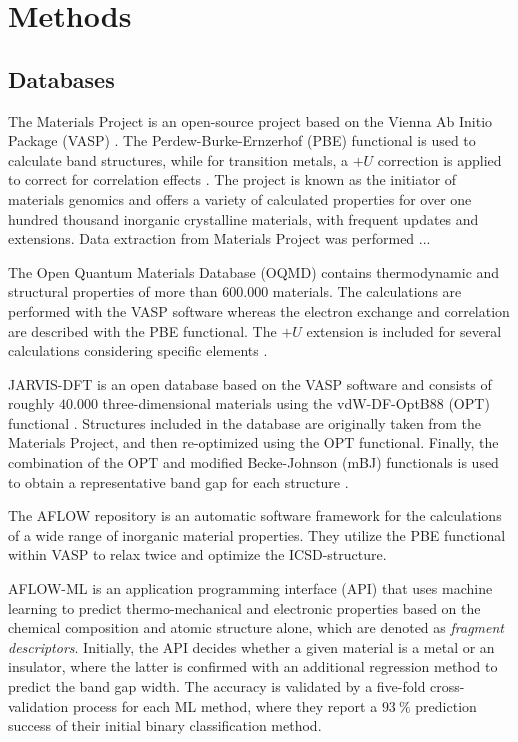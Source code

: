 \documentclass[superscriptaddress,unsortedaddress,
 amsmath,amssymb,
 aps,
]{revtex4-2}
\begin{document}
\section*{Methods}

\subsection*{Databases} 
The Materials Project \cite{Jain2013, Jain2018} is an open-source project based on the Vienna Ab Initio Package (VASP) \cite{Kresse1996}. The Perdew-Burke-Ernzerhof \cite{Perdew1996} (PBE) functional is used to calculate band structures, while for transition metals, a $+U$ correction is applied to correct for correlation effects \cite{Wang2006}. The project is known as the initiator of materials genomics and offers a variety of calculated properties for over one hundred thousand inorganic crystalline materials, with frequent updates and extensions. Data extraction from Materials Project was performed ... 

The Open Quantum Materials Database (OQMD) \cite{Saal2013, Kirklin2015} contains thermodynamic and structural properties of more than $600.000$  materials. The calculations are performed with the VASP software whereas the electron exchange and correlation are described with the PBE functional. The $+U$ extension is included for several calculations considering specific elements \cite{Stevanovic2012}. 

JARVIS-DFT \cite{Choudhary2020} is an open database based on the VASP software and consists of roughly $40.000$ three-dimensional materials using the vdW-DF-OptB88 (OPT) functional \cite{Thonhauser2007, Klimes2011}. Structures included in the database are originally taken from the Materials
Project, and then re-optimized using the OPT functional. Finally, the combination of the OPT and modified Becke-Johnson (mBJ) functionals is used to obtain a representative band gap for each structure \cite{Choudhary2018a}. 

The AFLOW \cite{Curtarolo2012, Curtarolo2012a, Calderon2015} repository is an automatic software framework for the calculations of a wide range of inorganic material properties. They utilize the PBE functional within VASP
to relax twice and optimize the ICSD-structure. 

AFLOW-ML \cite{Isayev2017} is an application programming interface (API) that uses machine learning to predict thermo-mechanical and electronic properties based on the chemical composition and atomic structure alone, which are denoted as \textit{fragment descriptors}. Initially, the API decides whether a given material is a metal or an insulator, where the latter is confirmed with an additional regression method to predict the band gap width. The accuracy is validated by a five-fold cross-validation process for each ML method, where they report a $93 \ \%$ prediction success of their initial binary classification method. 
\end{document}
